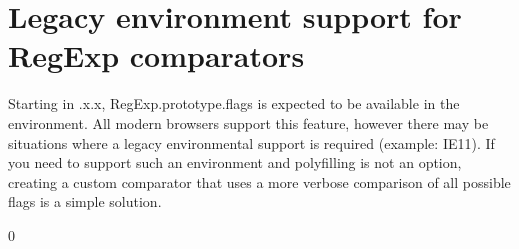 \chapter{Legacy environment support for {\ttfamily Reg\+Exp} comparators }
\hypertarget{md__c_1_2_users_2saket_2_one_drive_2_desktop_2e_pathshala_2epathshala-_web_2node__modules_2fast-b224c27a502ab1ecb31f15eadd752884}{}\label{md__c_1_2_users_2saket_2_one_drive_2_desktop_2e_pathshala_2epathshala-_web_2node__modules_2fast-b224c27a502ab1ecb31f15eadd752884}
\label{md__c_1_2_users_2saket_2_one_drive_2_desktop_2e_pathshala_2epathshala-_web_2node__modules_2fast-b224c27a502ab1ecb31f15eadd752884_autotoc_md11110}%
%


Starting in {.\+x.\+x}, {\ttfamily Reg\+Exp.\+prototype.\+flags} is expected to be available in the environment. All modern browsers support this feature, however there may be situations where a legacy environmental support is required (example\+: IE11). If you need to support such an environment and polyfilling is not an option, creating a custom comparator that uses a more verbose comparison of all possible flags is a simple solution.


\begin{DoxyCode}{0}
\DoxyCodeLine{}
\DoxyCodeLine{}
\DoxyCodeLine{\});}
\DoxyCodeLine{\});}

\end{DoxyCode}
 